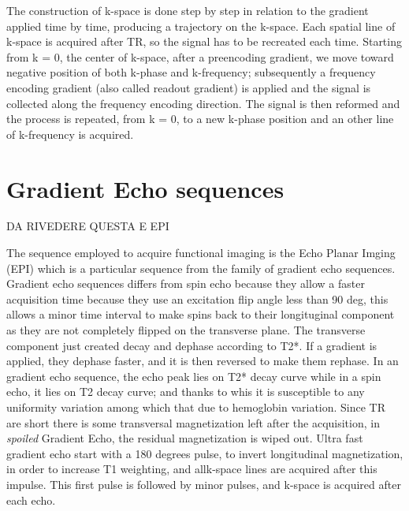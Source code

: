 \documentclass[11pt]{report}
\begin{document}
The construction of k-space is done step by step in relation to the gradient applied time by time, producing a trajectory on the k-space.
Each spatial line of k-space is acquired after TR, so the signal has to be recreated each time.
Starting from k = 0, the center of k-space, after a preencoding gradient, we move toward negative position of both k-phase and k-frequency; subsequently a frequency encoding gradient (also called readout gradient) is applied and the signal is collected along the frequency encoding direction.
The signal is then reformed and the process is repeated, from k = 0, to a new k-phase position and an other line of k-frequency is acquired.




\section{Gradient Echo sequences}
DA RIVEDERE QUESTA E EPI

The sequence employed to acquire functional imaging is the Echo Planar Imging (EPI) which is a particular sequence from the family of gradient echo sequences.
Gradient echo sequences differs from spin echo because they allow a faster acquisition time because they use an excitation flip angle less than 90 deg, this allows a minor time interval to make spins back to their longituginal component as they are not completely flipped on the transverse plane.
The transverse component just created decay and dephase according to T2*. If a gradient is applied, they dephase faster, and it is then reversed to make them rephase.
In an gradient echo sequence, the echo peak lies on T2* decay curve while in a spin echo, it lies on T2 decay curve; and thanks to whis it is susceptible to any uniformity variation among which that due to hemoglobin variation.
Since TR are short there is some transversal magnetization left after the acquisition, in \emph{spoiled} Gradient Echo, the residual magnetization is wiped out.
Ultra fast gradient echo start with a 180 degrees pulse, to invert longitudinal magnetization, in order to increase T1 weighting, and allk-space lines are acquired after this impulse. This first pulse is followed by minor pulses, and k-space is acquired after each echo.
\end{document}
